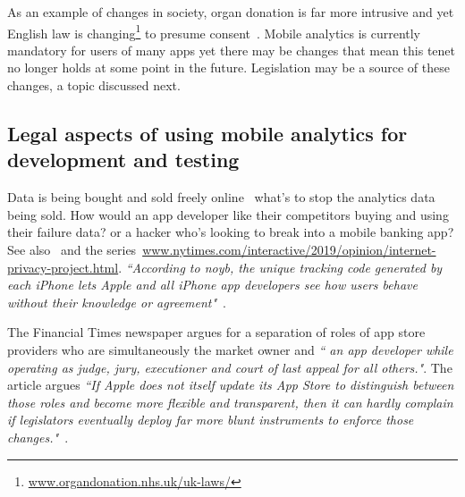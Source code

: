 As an example of changes in society, organ donation is far more intrusive and yet English law is changing\footnote{\href{https://www.organdonation.nhs.uk/uk-laws/}{www.organdonation.nhs.uk/uk-laws/}} to presume consent~. Mobile analytics is currently mandatory for users of many apps yet there may be changes that mean this tenet no longer holds at some point in the future. Legislation may be a source of these changes, a topic discussed next.

\subsection{Legal aspects of using mobile analytics for development and testing} \label{discussion-legal-aspects-of-using-mobile-analytics-topic}

Data is being bought and sold freely online~ what's to stop the analytics data being sold. How would an app developer like their competitors buying and using their failure data? or a hacker who's looking to break into a mobile banking app? See also~ and the series~\href{https://www.nytimes.com/interactive/2019/opinion/internet-privacy-project.html}{www.nytimes.com/interactive/2019/opinion/internet-privacy-project.html}. \emph{``According to noyb, the unique tracking code generated by each iPhone lets Apple and all iPhone app developers see how users behave without their knowledge or agreement"}~.

The Financial Times newspaper argues for a separation of roles of app store providers who are simultaneously the market owner and \emph{`` an app developer while operating as judge, jury, executioner and court of last appeal for all others."}. The article argues \emph{``If Apple does not itself update its App Store to distinguish between those roles and become more flexible and transparent, then it can hardly complain if legislators eventually deploy far more blunt instruments to enforce those changes."}~.

